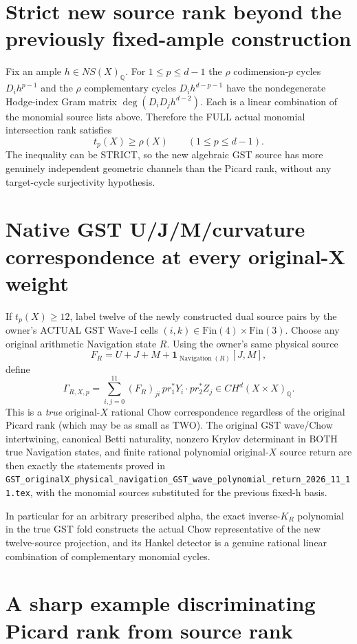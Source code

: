 \documentclass[11pt]{article}
\begin{document}
\section{Strict new source rank beyond the previously fixed-ample construction}

Fix an ample $h\in NS(X)_\mathbb Q$. For
$1\le p\le d-1$ the $\rho$ codimension-$p$
cycles $D_i h^{p-1}$ and the $\rho$
complementary cycles $D_i h^{d-p-1}$ have
the nondegenerate Hodge-index Gram matrix
$\deg(D_iD_j h^{d-2})$.
Each is a linear combination of the monomial source lists above.
Therefore the FULL actual monomial intersection rank satisfies
\[
\boxed{t_p(X)\ge\rho(X)}
\qquad(1\le p\le d-1).
\]
The inequality can be STRICT, so the new algebraic
GST source has more genuinely independent geometric
channels than the Picard rank, without any target-cycle
surjectivity hypothesis.

\section{Native GST U/J/M/curvature correspondence at every original-X weight}

If $t_p(X)\ge12$, label twelve of the newly
constructed dual source pairs by the
owner's ACTUAL GST Wave-I cells
$(i,k)\in\mathrm{Fin}(4)\times\mathrm{Fin}(3)$.
Choose any original arithmetic Navigation state $R$.
Using the owner's same physical source
\[
F_R=U+J+M+\mathbf1_{\operatorname{Navigation}(R)}[J,M],
\]
define
\[
\boxed{
\Gamma_{R,X,p}
=\sum_{i,j=0}^{11}(F_R)_{ji}
 \,pr_1^*Y_i\cdot pr_2^*Z_j
\in CH^d(X\times X)_{\mathbb Q}.
}
\]
This is a \emph{true} original-$X$ rational
Chow correspondence regardless of the original
Picard rank (which may be as small as TWO).
The original GST wave/Chow intertwining,
canonical Betti naturality, nonzero Krylov
determinant in BOTH true Navigation states,
and finite rational polynomial original-$X$
source return are then exactly the statements
proved in
\texttt{GST\_originalX\_physical\_navigation\_GST\_wave\_polynomial\_return\_2026\_11\_11.tex},
with the monomial sources substituted for
the previous fixed-h basis.

In particular for an arbitrary prescribed alpha,
the exact inverse-$K_R$ polynomial in the true
GST fold constructs the actual Chow representative
of the new twelve-source projection, and its
Hankel detector is a genuine rational linear
combination of complementary monomial cycles.

\section{A sharp example discriminating Picard rank from source rank}
\end{document}
